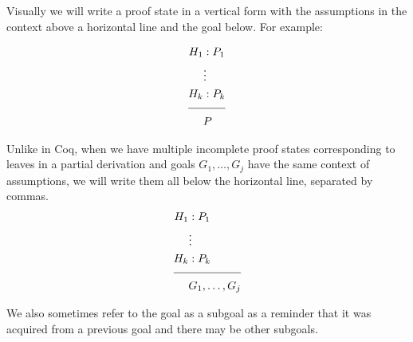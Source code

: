 Visually we will write a proof state in a vertical form with the assumptions in the context above a horizontal line and the goal below. For example:

\begin{align*}
H_1 &: P_1 \\
&\large{\vdots} \\
H_k &: P_k \\[\pfshift{}]
\cline{1-2}
& P
\end{align*}


Unlike in Coq, when we have multiple incomplete proof states corresponding to leaves in a partial derivation and goals $G_1, \ldots , G_j$ have the same context of assumptions, we will write them all below the horizontal line, separated by commas.
\begin{align*}
H_1 &: P_1 \\
&\large{\vdots} \\
H_k &: P_k \\[\pfshift{}]
\cline{1-2}
& G_1 , \ldots , G_j
\end{align*}

We also sometimes refer to the goal as a subgoal as a reminder that it was acquired from a previous goal and there may be other subgoals.


